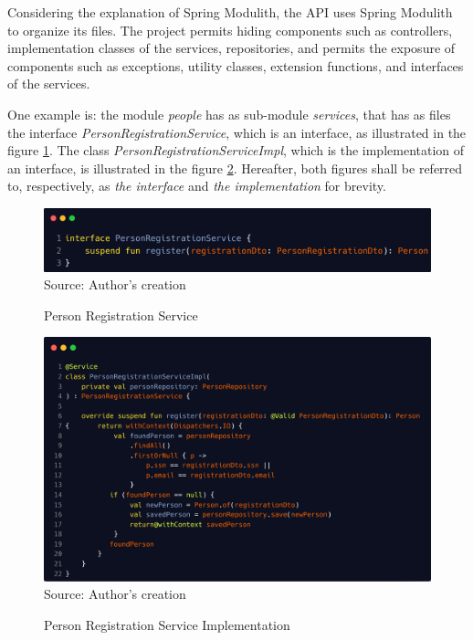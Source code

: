 Considering the explanation of Spring Modulith, the API uses Spring Modulith to organize its files. The project permits hiding components such as controllers, implementation classes of the services, repositories, and permits the exposure of components such as exceptions, utility classes, extension functions, and interfaces of the services. 

One example is: the module \textit{people} has as sub-module \textit{services}, that has as files the interface 
\textit{PersonRegistrationService}, which is an interface, as illustrated in the figure \ref{fig:person_registration_service}. The class \textit{PersonRegistrationServiceImpl}, which is the implementation of an interface, is illustrated in the figure \ref{fig:person_registration_service_impl}. Hereafter, both figures shall be referred to, respectively, as \textit{the interface} and \textit{the implementation} for brevity.

\begin{figure}[H]
    \centering
    \caption{Person Registration Service}
    \includegraphics[width=1\linewidth]{figures/person_registration_service.png}
    \label{fig:person_registration_service}
    \footnotesize Source: Author's creation
\end{figure}

\begin{figure}[H]
    \centering
    \caption{Person Registration Service Implementation}
    \includegraphics[width=0.87\linewidth]{figures/person_registration_service_impl.png}
    \label{fig:person_registration_service_impl}
    \\ \footnotesize Source: Author's creation
\end{figure}

